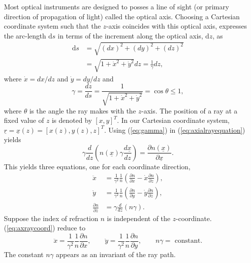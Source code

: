 \documentclass{article}
\begin{document}
Most optical instruments are designed to posses a line of sight (or primary direction of propagation of light) called the optical axis. Choosing a Cartesian coordinate system such that the $z$-axis coincides with this optical axis, expresses the arc-length $\mathrm{d}s$ in terms of the increment along the optical axis, $\mathrm{d}z$, as
\begin{align}
	\mathrm{d}s &= \sqrt{(dx)^2 + (dy)^2 + (dz)^2} \\
	&= \sqrt{1+\dot{x}^2 +\dot{y}^2} d z = \frac{1}{\gamma} d z,
\end{align}
where $\dot{x} = d x / dz$ and $\dot{y} = dy/dz$ and 
\begin{equation}
	\label{eq:gamma}
	\gamma = \frac{d z}{d s} = \frac{1}{\sqrt{1+\dot{x}^2+\dot{y}^2}} = \cos \theta\leq 1,
\end{equation}
where $\theta$ is the angle the ray makes with the $z$-axis. The position of a ray at a fixed value of $z$ is denoted by $[x,y]^T$. In our Cartesian coordinate system, $\underline{r}=\underline{x}(z) = [x(z),y(z),z]^T$. Using (\ref{eq:gamma}) in (\ref{eq:axialrayequation}) yields
\begin{equation}
	\gamma \frac{d}{dz} \left(n(\underline{x}) \gamma \frac{d \underline{x}}{d z} \right)  = \frac{\partial n(\underline{x})}{\partial \underline{x}}.
\end{equation}
This yields three equations, one for each coordinate direction,
\begin{equation}
	\label{eq:axraycoord}
	\begin{aligned}
		\ddot{x}  &= \frac{1}{\gamma^2} \frac{1}{n} \left(\frac{\partial n}{\partial x} - \dot{x} \frac{\partial n}{\partial z} \right), \\
		\ddot{y} &= \frac{1}{\gamma^2} \frac{1}{n} \left(\frac{\partial n}{\partial y} - \dot{y} \frac{\partial n}{\partial z} \right), \\
		\frac{\partial n}{\partial z} &= \gamma \frac{d}{dz}\left(n  \gamma\right).
	\end{aligned}
\end{equation}	
Suppose the index of refraction $n$ is independent of the $z$-coordinate. (\ref{eq:axraycoord}) reduce to
\begin{equation}
	\label{eq:axraycoord2}
		\ddot{x}  = \frac{1}{\gamma^2} \frac{1}{n} \frac{\partial n}{\partial x}, \qquad
		\ddot{y} = \frac{1}{\gamma^2} \frac{1}{n} \frac{\partial n}{\partial y}, \qquad n\gamma = \mbox{ constant}.
\end{equation}
The constant $n\gamma$ appears as an invariant of the ray path. 
\end{document}
